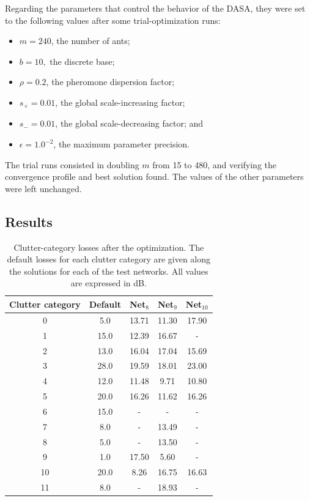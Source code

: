 Regarding the parameters that control the behavior of the DASA, they
were set to the following values after some trial-optimization runs:
\begin{itemize}
\item $m=240$, the number of ants;
\item $b=10,$ the discrete base;
\item $\rho=0.2$, the pheromone dispersion factor;
\item $s_{+}=0.01$, the global scale-increasing factor;
\item $s_{-}=0.01$, the global scale-decreasing factor; and 
\item $\epsilon=1.0^{-2}$, the maximum parameter precision.
\end{itemize}
The trial runs consisted in doubling $m$ from 15 to 480, and verifying
the convergence profile and best solution found. The values of the
other parameters were left unchanged.


\subsection{Results}

\begin{table}
\centering

\caption{Clutter-category losses after the optimization. The default losses
for each clutter category are given along the solutions for each of
the test networks. All values are expressed in dB. \label{tab:05-Clutter_optimization_solutions}}


{\small{}}%
\begin{tabular}{ccccc}
\hline 
{\small{Clutter category}} & {\small{Default}} & {\small{Net$_{8}$}} & {\small{Net$_{9}$}} & {\small{Net$_{10}$}}\tabularnewline
\hline 
{\small{0}} & {\small{5.0}} & {\small{13.71}} & {\small{11.30}} & {\small{17.90}}\tabularnewline
{\small{1}} & {\small{15.0}} & {\small{12.39}} & {\small{16.67}} & {\small{-}}\tabularnewline
{\small{2}} & {\small{13.0}} & {\small{16.04}} & {\small{17.04}} & {\small{15.69}}\tabularnewline
{\small{3}} & {\small{28.0}} & {\small{19.59}} & {\small{18.01}} & {\small{23.00}}\tabularnewline
{\small{4}} & {\small{12.0}} & {\small{11.48}} & {\small{9.71}} & {\small{10.80}}\tabularnewline
{\small{5}} & {\small{20.0}} & {\small{16.26}} & {\small{11.62}} & {\small{16.26}}\tabularnewline
{\small{6}} & {\small{15.0}} & {\small{-}} & {\small{-}} & {\small{-}}\tabularnewline
{\small{7}} & {\small{8.0}} & {\small{-}} & {\small{13.49}} & {\small{-}}\tabularnewline
{\small{8}} & {\small{5.0}} & {\small{-}} & {\small{13.50}} & {\small{-}}\tabularnewline
{\small{9}} & {\small{1.0}} & {\small{17.50}} & {\small{5.60}} & {\small{-}}\tabularnewline
{\small{10}} & {\small{20.0}} & {\small{8.26}} & {\small{16.75}} & {\small{16.63}}\tabularnewline
{\small{11 }} & {\small{8.0}} & {\small{-}} & {\small{18.93}} & {\small{-}}\tabularnewline
\hline 
\end{tabular}
\end{table}



